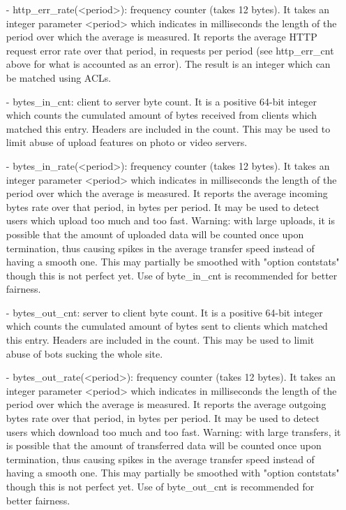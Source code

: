 \begin{description}
\begin{itemize}
  \item[-] http\_err\_rate(<period>): frequency counter (takes 12 bytes). It takes an
      integer parameter <period> which indicates in milliseconds the length
      of the period over which the average is measured. It reports the average
      HTTP request error rate over that period, in requests per period (see
      http\_err\_cnt above for what is accounted as an error). The result is an
      integer which can be matched using ACLs.

  \item[-] bytes\_in\_cnt: client to server byte count. It is a positive 64-bit
      integer which counts the cumulated amount of bytes received from clients
      which matched this entry. Headers are included in the count. This may be
      used to limit abuse of upload features on photo or video servers.

  \item[-] bytes\_in\_rate(<period>): frequency counter (takes 12 bytes). It takes an
      integer parameter <period> which indicates in milliseconds the length
      of the period over which the average is measured. It reports the average
      incoming bytes rate over that period, in bytes per period. It may be used
      to detect users which upload too much and too fast. Warning: with large
      uploads, it is possible that the amount of uploaded data will be counted
      once upon termination, thus causing spikes in the average transfer speed
      instead of having a smooth one. This may partially be smoothed with
      "option contstats" though this is not perfect yet. Use of byte\_in\_cnt is
      recommended for better fairness.

  \item[-] bytes\_out\_cnt: server to client byte count. It is a positive 64-bit
      integer which counts the cumulated amount of bytes sent to clients which
      matched this entry. Headers are included in the count. This may be used
      to limit abuse of bots sucking the whole site.

  \item[-] bytes\_out\_rate(<period>): frequency counter (takes 12 bytes). It takes
      an integer parameter <period> which indicates in milliseconds the length
      of the period over which the average is measured. It reports the average
      outgoing bytes rate over that period, in bytes per period. It may be used
      to detect users which download too much and too fast. Warning: with large
      transfers, it is possible that the amount of transferred data will be
      counted once upon termination, thus causing spikes in the average
      transfer speed instead of having a smooth one. This may partially be
      smoothed with "option contstats" though this is not perfect yet. Use of
      byte\_out\_cnt is recommended for better fairness.


\end{itemize}
\end{description}
